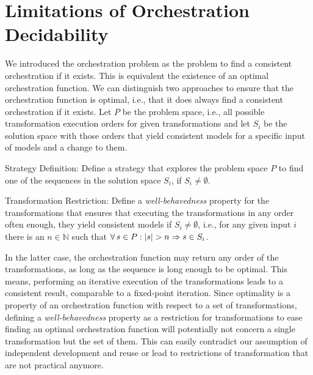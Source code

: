 \section{Limitations of Orchestration Decidability}
\label{chap:orchestration:decidability}

We introduced the orchestration problem as the problem to find a consistent orchestration if it exists.
This is equivalent the existence of an optimal orchestration function.
We can distinguish two approaches to ensure that the orchestration function is optimal, i.e., that it does always find a consistent orchestration if it exists.
Let $P$ be the problem space, i.e., all possible transformation execution orders for given transformations and let $S_{i}$ be the solution space with those orders that yield consistent models for a specific input of models and a change to them.
\begin{properdescription}
    \item[Strategy Definition:] Define a strategy that explores the problem space $P$ to find one of the sequences in the solution space $S_{i}$, if $S_{i} \neq \emptyset$.
    \item[Transformation Restriction:] Define a \emph{well-behavedness} property for the transformations that ensures that executing the transformations in any order often enough, they yield consistent models if $S_{i} \neq \emptyset$, i.e., for any given input $i$ there is an $n \in \mathbb{N}$ such that $\forall s \in P : \abs{s} > n \Rightarrow s \in S_{i}$.
\end{properdescription}


In the latter case, the orchestration function may return any order of the transformations, as long as the sequence is long enough to be optimal.
This means, performing an iterative execution of the transformations leads to a consistent result, comparable to a fixed-point iteration.
Since optimality is a property of an orchestration function with respect to a set of transformations, defining a \emph{well-behavedness} property as a restriction for transformations to ease finding an optimal orchestration function will potentially not concern a single transformation but the set of them.
This can easily contradict our assumption of independent development and reuse or lead to restrictions of transformation that are not practical anymore.

